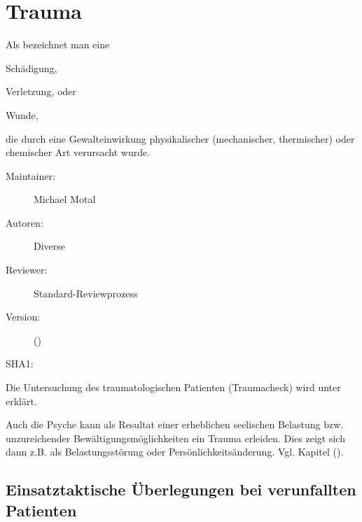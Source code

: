 \def\ChapterCode{TRA}
% 
\chapter
[\CO{[TRA]} Trauma]
{Trauma}
\label{chp:TRA}

\ChapterIntro
{%
 Als   bezeichnet man eine
\begin{inparaenum}
  \item Schädigung,
  \item Verletzung, oder
  \item Wunde,
\end{inparaenum}
die durch eine
Gewalteinwirkung physikalischer (mechanischer,  thermischer)
oder chemischer Art verursacht wurde.
}
{%
\begin{description}
  \item[Maintainer:] Michael Motal
  \item[Autoren:] Diverse
  \item[Reviewer:] Standard-Reviewprozess
  \item[Version:] {\DocVersion} ({\DocVersionInfo})
  \item[SHA1:] {\DocGitCommit}
\end{description}

{\TxTeilkapitelAASS}
}


\clearpage


Die Untersuchung des traumatologischen Patienten
(Traumacheck) wird unter 
erklärt.

Auch die Psyche kann als Resultat einer erheblichen
seelischen Belastung bzw. unzureichender
Bewältigungsmöglichkeiten ein Trauma erleiden. Dies zeigt
sich dann z.B. als Belastungsstörung oder
Persönlichkeitsänderung. Vgl. Kapitel \CO{[PSY]}
().






\section{Einsatztaktische Überlegungen bei verunfallten Patienten}


